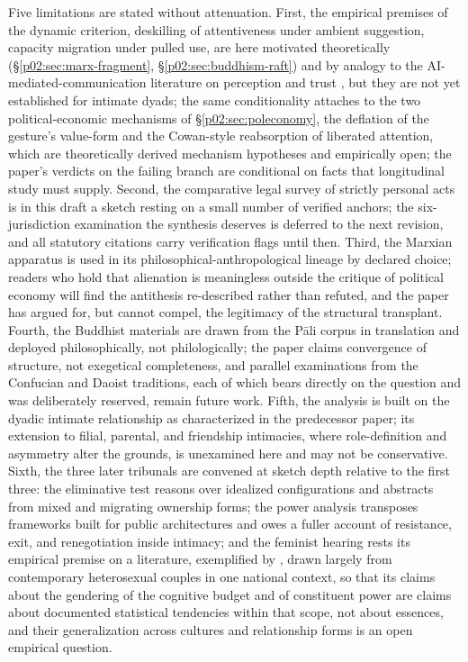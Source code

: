 \documentclass[11pt,a4paper]{article}
\begin{document}
Five limitations are stated without attenuation. First, the empirical premises of the dynamic criterion, deskilling of attentiveness under ambient suggestion, capacity migration under pulled use, are here motivated theoretically (\S\ref{p02:sec:marx-fragment}, \S\ref{p02:sec:buddhism-raft}) and by analogy to the AI-mediated-communication literature on perception and trust \parencite{hancock2020ai,jakesch2019ai}, but they are not yet established for intimate dyads; the same conditionality attaches to the two political-economic mechanisms of \S\ref{p02:sec:poleconomy}, the deflation of the gesture's value-form and the Cowan-style reabsorption of liberated attention, which are theoretically derived mechanism hypotheses and empirically open; the paper's verdicts on the failing branch are conditional on facts that longitudinal study must supply. Second, the comparative legal survey of strictly personal acts is in this draft a sketch resting on a small number of verified anchors; the six-jurisdiction examination the synthesis deserves is deferred to the next revision, and all statutory citations carry verification flags until then. Third, the Marxian apparatus is used in its philosophical-anthropological lineage by declared choice; readers who hold that alienation is meaningless outside the critique of political economy will find the antithesis re-described rather than refuted, and the paper has argued for, but cannot compel, the legitimacy of the structural transplant. Fourth, the Buddhist materials are drawn from the P\=ali corpus in translation and deployed philosophically, not philologically; the paper claims convergence of structure, not exegetical completeness, and parallel examinations from the Confucian and Daoist traditions, each of which bears directly on the question and was deliberately reserved, remain future work. Fifth, the analysis is built on the dyadic intimate relationship as characterized in the predecessor paper; its extension to filial, parental, and friendship intimacies, where role-definition and asymmetry alter the grounds, is unexamined here and may not be conservative. Sixth, the three later tribunals are convened at sketch depth relative to the first three: the eliminative test reasons over idealized configurations and abstracts from mixed and migrating ownership forms; the power analysis transposes frameworks built for public architectures and owes a fuller account of resistance, exit, and renegotiation inside intimacy; and the feminist hearing rests its empirical premise on a literature, exemplified by \textcite{daminger2019cognitive}, drawn largely from contemporary heterosexual couples in one national context, so that its claims about the gendering of the cognitive budget and of constituent power are claims about documented statistical tendencies within that scope, not about essences, and their generalization across cultures and relationship forms is an open empirical question.
\end{document}
